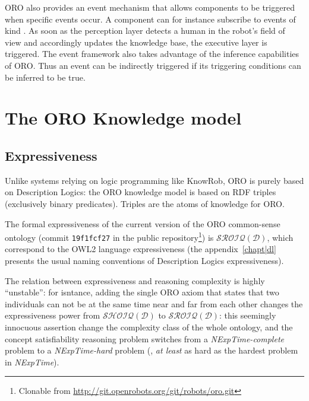 ORO also provides an event mechanism that allows components to be triggered
when specific events occur. A component can for instance subscribe to events
of kind . As soon as the
perception layer detects a human in the robot's field of view and accordingly
updates the knowledge base, the executive layer is triggered. The event
framework also takes advantage of the inference capabilities of ORO. Thus an
event can be indirectly triggered if its triggering conditions can be
inferred to be true.




\section{The ORO Knowledge model}
\label{sect|knowledge-model}

\subsection{Expressiveness}

Unlike systems relying on logic programming like {\sc KnowRob}, ORO is purely
based on Description Logics: the ORO knowledge model is based on RDF triples
(\ie exclusively binary predicates). Triples 
are the atoms of knowledge for ORO.

The formal expressiveness of the current version of the ORO common-sense
ontology (commit {\tt 19f1fcf27} in the public repository\footnote{Clonable
from \url{http://git.openrobots.org/git/robots/oro.git}}) is
$\mathcal{SROIQ(D)}$, which correspond to the OWL2 language expressiveness (the
appendix~\ref{chapt|dl} presents the usual naming conventions of Description
Logics expressiveness).

The relation between expressiveness and reasoning complexity is highly
``unstable'': for isntance, adding  the single ORO axiom  that states that two individuals can not be at the same
time near and far from each other changes the expressiveness power from
$\mathcal{SHOIQ(D)}$ to $\mathcal{SROIQ(D)}$: this seemingly  innocuous
assertion change the complexity class of the whole ontology, and the concept
satisfiability reasoning problem switches from a {\it NExpTime-complete}
problem to a {\it NExpTime-hard} problem (\ie, \emph{at least} as hard as the
hardest problem in {\it NExpTime}).

